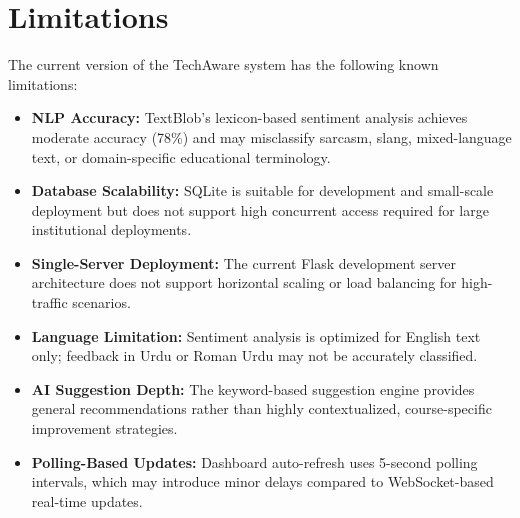\section{Limitations}

The current version of the TechAware system has the following known limitations:

\begin{itemize}
    \item \textbf{NLP Accuracy:} TextBlob's lexicon-based sentiment analysis achieves moderate accuracy (78\%) and may misclassify sarcasm, slang, mixed-language text, or domain-specific educational terminology.
    \item \textbf{Database Scalability:} SQLite is suitable for development and small-scale deployment but does not support high concurrent access required for large institutional deployments.
    \item \textbf{Single-Server Deployment:} The current Flask development server architecture does not support horizontal scaling or load balancing for high-traffic scenarios.
    \item \textbf{Language Limitation:} Sentiment analysis is optimized for English text only; feedback in Urdu or Roman Urdu may not be accurately classified.
    \item \textbf{AI Suggestion Depth:} The keyword-based suggestion engine provides general recommendations rather than highly contextualized, course-specific improvement strategies.
    \item \textbf{Polling-Based Updates:} Dashboard auto-refresh uses 5-second polling intervals, which may introduce minor delays compared to WebSocket-based real-time updates.
\end{itemize}
